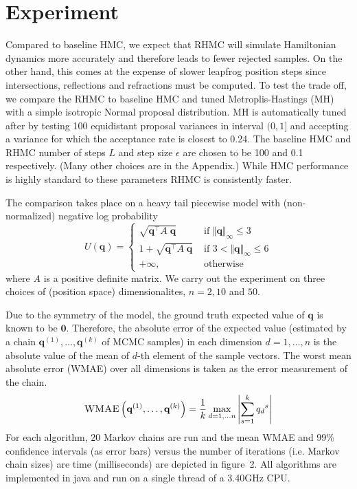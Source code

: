\documentclass{article} %
\newcommand{\bvec}[1]{\textbf{#1}}
\newcommand{\case}[2]{#2 &\text{ if } #1}%
\newcommand{\otherwise}[1]{#1 &\text{ otherwise}}
\begin{document}
\section{Experiment} \label{sect:example}
Compared to baseline HMC, we expect that RHMC will simulate Hamiltonian dynamics more accurately and therefore leads to fewer rejected samples.  On the other hand, this comes at the expense of slower leapfrog position steps since intersections, reflections and refractions must be computed. To test the trade off, we    
compare the RHMC to baseline HMC \cite{neal2011mcmc} and tuned Metroplis-Hastings (MH) with a simple isotropic Normal proposal distribution.  MH is automatically tuned after \cite{roberts1997weak} by testing 100 equidistant proposal variances in interval $(0, 1]$ and accepting a variance for which the acceptance rate is closest to 0.24.
The baseline HMC and RHMC number of steps $L$ and step size $\epsilon$ are chosen to be 100 and 0.1 respectively. (Many other choices are in the Appendix.) While HMC performance is highly standard to these parameters \cite{homan2014no} RHMC is consistently faster.

The comparison takes place on a heavy tail piecewise model with (non-normalized) negative log probability  
\begin{equation}
U(\bvec{q}) =
\begin{cases}
\case{\Vert \bvec{q} \Vert_\infty \leq 3}{\sqrt{\bvec{q}^\top A \; \bvec{q}}}\\
\case{3 < \Vert \bvec{q} \Vert_\infty \leq 6 }{1 + \sqrt{\bvec{q}^\top A \; \bvec{q}}}\\
\otherwise{+ \infty,}
\end{cases}
\label{eq:Uq}
\end{equation}
where $A$ is a positive definite matrix.  We carry out the experiment on three choices of (position space) dimensionalites,  $n = 2, 10$ and $50$.


Due to the symmetry of the model, the ground truth expected value of $\bvec{q}$ is known to be $\bvec{0}$.
Therefore, the absolute error of the expected value (estimated by a chain $\bvec{q}^{(1)}, \ldots, \bvec{q}^{(k)}$ of MCMC samples) in each dimension $d = 1, \ldots, n$ is 
the absolute value of the mean of $d$-th element of the sample vectors.
The worst mean absolute error (WMAE) over all dimensions is taken as the error measurement of the chain.
\begin{equation}
\textsc{WMAE} \left( \bvec{q}^{(1)}, \ldots, \bvec{q}^{(k)} \right) = \frac{1}{k}
\max_{d=1, \ldots n} 
\left|\sum_{s=1}^k {q_d}^{s} \right|
\label{eq:WMAE}
\end{equation}
For each algorithm, 20 Markov chains are run and the mean WMAE and 99\% confidence intervals (as error bars) versus the number of iterations (i.e. Markov chain sizes) are time (milliseconds) are depicted in 
figure~2. All algorithms are implemented in java and run on a single thread of a 3.40GHz CPU.
\end{document}
